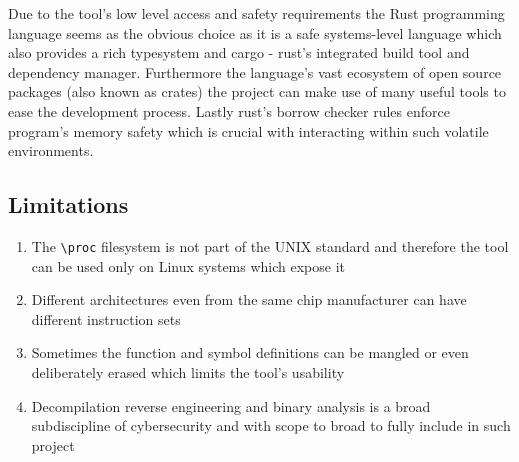 Due to the tool's low level access and safety requirements the Rust programming language seems as the obvious choice as it is a safe systems-level language which also provides a rich typesystem and cargo - rust's integrated build tool and dependency manager. 
Furthermore the language's vast ecosystem of open source packages (also known as crates) the project can make use of many useful tools to ease the development process.
Lastly rust's borrow checker rules \cite{rust_foundation_rust-langrust_2024} enforce program's memory safety which is crucial with interacting within such volatile environments.

\subsection{Limitations}

\begin{enumerate}
    \item The \verb|\proc| filesystem is not part of the UNIX standard \cite{kerrisk_proc_2010} and therefore the tool can be used only on Linux systems which expose it
    \item Different architectures even from the same chip manufacturer can have different instruction sets \cite{intel_corporation_intel_2024}
    \item Sometimes the function and symbol definitions can be mangled or even deliberately erased which limits the tool's usability
    \item Decompilation reverse engineering and binary analysis is a broad subdiscipline of cybersecurity and with scope to broad to fully include in such project
\end{enumerate}

